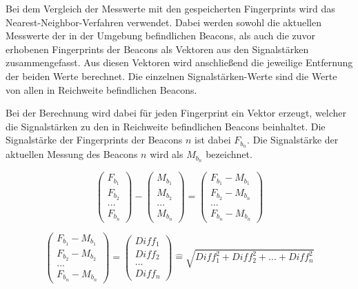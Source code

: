 Bei dem Vergleich der Messwerte mit den gespeicherten Fingerprints wird das Nearest-Neighbor-Verfahren verwendet. Dabei werden sowohl die aktuellen Messwerte der in der Umgebung befindlichen Beacons, als auch die zuvor erhobenen Fingerprints der Beacons als Vektoren aus den Signalstärken zusammengefasst. Aus diesen Vektoren wird anschließend die jeweilige Entfernung der beiden Werte berechnet. Die einzelnen Signalstärken-Werte sind die Werte von allen in Reichweite befindlichen Beacons.

Bei der Berechnung wird dabei für jeden Fingerprint ein Vektor erzeugt, welcher die Signalstärken zu den in Reichweite befindlichen Beacons beinhaltet.
Die Signalstärke der Fingerprints der Beacons $n$ ist dabei $F_{b_n}$.
Die Signalstärke der aktuellen Messung des Beacons $n$ wird als $M_{b_n}$ bezeichnet.


\begin{equation}
	\begin{pmatrix}
		F_{b_1} \\
		F_{b_2} \\
		... \\
		F_{b_n}
	\end{pmatrix} -
	\begin{pmatrix}
		M_{b_1} \\
		M_{b_2} \\
		... \\
		M_{b_n}
	\end{pmatrix}
	= 
	\begin{pmatrix}
		F_{b_1} - M_{b_1} \\
		F_{b_2} - M_{b_n} \\
		... \\
		F_{b_n} - M_{b_n}
	\end{pmatrix}
\end{equation}

\begin{equation}
	\begin{pmatrix}
		F_{b_1} - M_{b_1} \\
		F_{b_2} - M_{b_2} \\
		... \\
		F_{b_n} - M_{b_n}
	\end{pmatrix}
	=
	\begin{pmatrix}
		Diff_1 \\
		Diff_2 \\
		... \\
		Diff_n
	\end{pmatrix}
	\widehat{=}
	\sqrt{Diff_1^2 + Diff_2^2 + ... + Diff_n^2}
\end{equation}

